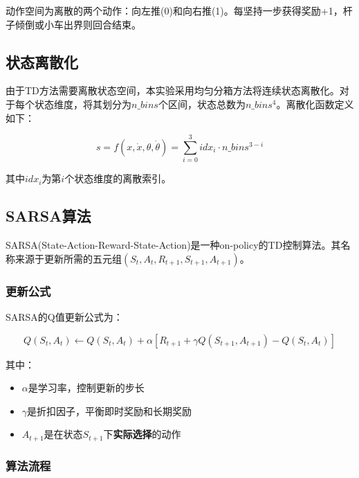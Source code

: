 \documentclass[12pt,a4paper]{article}
\begin{document}
动作空间为离散的两个动作：向左推(0)和向右推(1)。每坚持一步获得奖励+1，杆子倾倒或小车出界则回合结束。

\subsection{状态离散化}

由于TD方法需要离散状态空间，本实验采用均匀分箱方法将连续状态离散化。对于每个状态维度，将其划分为$n\_bins$个区间，状态总数为$n\_bins^4$。离散化函数定义如下：

\begin{equation}
s = f(x, \dot{x}, \theta, \dot{\theta}) = \sum_{i=0}^{3} idx_i \cdot n\_bins^{3-i}
\end{equation}

其中$idx_i$为第$i$个状态维度的离散索引。

\subsection{SARSA算法}

SARSA(State-Action-Reward-State-Action)是一种on-policy的TD控制算法。其名称来源于更新所需的五元组$(S_t, A_t, R_{t+1}, S_{t+1}, A_{t+1})$。

\subsubsection{更新公式}

SARSA的Q值更新公式为：

\begin{equation}
Q(S_t, A_t) \leftarrow Q(S_t, A_t) + \alpha [R_{t+1} + \gamma Q(S_{t+1}, A_{t+1}) - Q(S_t, A_t)]
\end{equation}

其中：
\begin{itemize}
    \item $\alpha$是学习率，控制更新的步长
    \item $\gamma$是折扣因子，平衡即时奖励和长期奖励
    \item $A_{t+1}$是在状态$S_{t+1}$下\textbf{实际选择}的动作
\end{itemize}

\subsubsection{算法流程}
\end{document}
